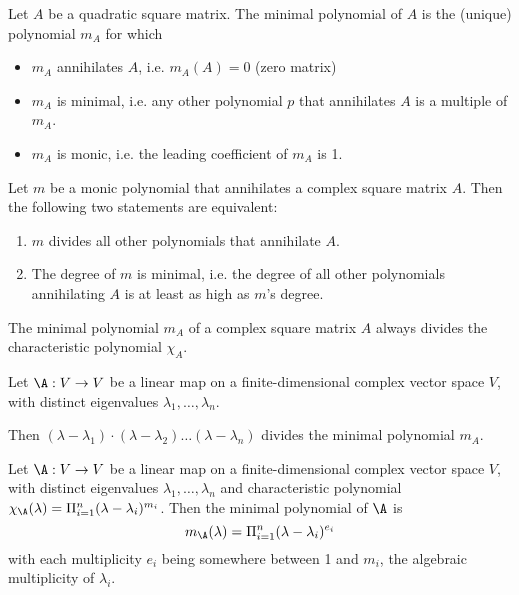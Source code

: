 \begin{definition}
    Let $A$ be a quadratic square matrix. The minimal polynomial of $A$ is the (unique) polynomial $m_A$ for which
    \begin{itemize}
        \item $m_A$ annihilates $A$, i.e. $m_A(A) = 0$ (zero matrix)
        \item $m_A$ is minimal, i.e. any other polynomial $p$ that annihilates $A$ is a multiple of $m_A$.
        \item $m_A$ is monic, i.e. the leading coefficient of $m_A$ is 1.
    \end{itemize}
\end{definition}

\begin{theorem}
    Let $m$ be a monic polynomial that annihilates a complex square matrix $A$. Then the following two statements are
    equivalent:
    \begin{enumerate}
        \item $m$ divides all other polynomials that annihilate $A$.
        \item The degree of $m$ is minimal, i.e. the degree of all other polynomials annihilating $A$ is at least as
            high as $m$'s degree.
    \end{enumerate}
\end{theorem}

\begin{corollary}
    The minimal polynomial $m_A$ of a complex square matrix $A$ always divides the characteristic polynomial $\chi_A$.
\end{corollary}

\begin{theorem}
    Let $\A: V \to V$ be a linear map on a finite-dimensional complex vector space $V$, with distinct
    eigenvalues $\lambda_1,\dots,\lambda_n$.

    Then $(\lambda-\lambda_1)\cdot(\lambda-\lambda_2)\dots(\lambda-\lambda_n)$ divides the minimal polynomial $m_A$.
\end{theorem}

\begin{corollary}
    Let $\A:V \to V$ be a linear map on a finite-dimensional complex vector space $V$, with distinct eigenvalues
    $\lambda_1, \dots, \lambda_n$ and characteristic polynomial $\chi_\A(\lambda)=\Pi_{i=1}^n(\lambda-\lambda_i)^{m_i}$.
    Then the minimal polynomial of $\A$ is
    $$m_\A(\lambda)=\Pi_{i=1}^n(\lambda-\lambda_i)^{e_i}$$
    with each multiplicity $e_i$ being somewhere between 1 and $m_i$, the algebraic multiplicity of $\lambda_i$.
\end{corollary}

